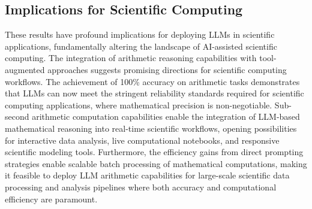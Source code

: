 \documentclass{article}
\begin{document}
\subsection{Implications for Scientific Computing}

These results have profound implications for deploying LLMs in scientific applications, fundamentally altering the landscape of AI-assisted scientific computing. The integration of arithmetic reasoning capabilities with tool-augmented approaches \citep{mishra2024mathsensei} suggests promising directions for scientific computing workflows. The achievement of 100\% accuracy on arithmetic tasks demonstrates that LLMs can now meet the stringent reliability standards required for scientific computing applications, where mathematical precision is non-negotiable. Sub-second arithmetic computation capabilities enable the integration of LLM-based mathematical reasoning into real-time scientific workflows, opening possibilities for interactive data analysis, live computational notebooks, and responsive scientific modeling tools. Furthermore, the efficiency gains from direct prompting strategies enable scalable batch processing of mathematical computations, making it feasible to deploy LLM arithmetic capabilities for large-scale scientific data processing and analysis pipelines where both accuracy and computational efficiency are paramount.




\end{document}
